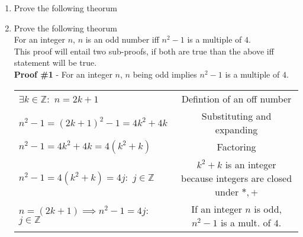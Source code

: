 \documentclass[a4paper,11pt]{article}
\newcommand{\answer}{\textbf{Answer : }}
\begin{document}
\begin{enumerate}
  \begin{enumerate}

  \item $x \equiv -75 (\textrm{ mod } 11)$
  \answer $x = 2$

  \item $x \equiv 895 (\textrm{ mod } 7)$
  \answer $x = 6$

  \item $x \equiv 2^{126} (\textrm{ mod } 5)$

  \item $x^2 \equiv 9 (\textrm{ mod } 11)$
  \answer $x^2 = 9, x = 3$
  \end{enumerate}



\item Prove the following theorum


\item Prove the following theorum \\
For an integer $n$, $n$ is an odd number iff $n^2-1$ is a multiple of $4$. \\
This proof will entail two sub-proofs, if both are true than the above iff statement will be true.\\[.25in]
\textbf{Proof \#1} - For an integer $n$, $n$ being odd implies $n^2-1$ is a multiple of $4$. \\

\begin{tabular}{l | c}
$\exists k \in \mathbb{Z} : $ $n = 2k+1$             & Defintion of an off number \\
$n^2-1 = (2k+1)^2-1 = 4k^2 + 4k$                     & Substituting and expanding \\
$n^2-1 = 4k^2 + 4k = 4(k^2+k)$                       & Factoring \\
$n^2-1 = 4(k^2+k) = 4j :$ $j \in \mathbb{Z}$         & $k^2+k$ is an integer because integers are closed under $*, +$ \\
$n = (2k+1) \implies n^2-1 = 4j :$ $j \in \mathbb{Z}$ & If an integer $n$ is odd, $n^2-1$ is a mult. of $4$. \\
\end{tabular} \\


\end{enumerate}
\end{document}
